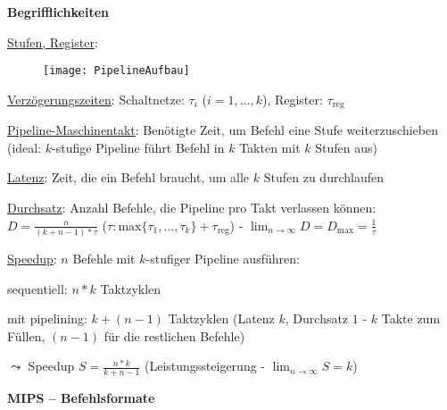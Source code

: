 \textbf{Begrifflichkeiten}
\begin{items}
  \item \underline{Stufen, Register}:
  \begin{figure}[H]
    \centering
    \label{PipelineAufbau}
    \texttt{[image: PipelineAufbau]}
  \end{figure}

  \item \underline{Verzögerungszeiten}: Schaltnetze: $\tau_i$ ($i=1,\dots,k$), Register: $\tau_{\text{reg}}$

  \item \underline{Pipeline-Maschinentakt}: Benötigte Zeit, um Befehl eine Stufe weiterzuschieben (ideal: $k$-stufige Pipeline führt Befehl in $k$ Takten mit $k$ Stufen aus)
  \item \underline{Latenz}: Zeit, die ein Befehl braucht, um alle $k$ Stufen zu durchlaufen
  \item \underline{Durchsatz}: Anzahl Befehle, die Pipeline pro Takt verlassen können: $D=\tfrac{n}{(k+n-1)*\tau}$ ($\tau: \text{max}\{ \tau_1,\dots,\tau_k \} + \tau_\text{reg}$) - $\lim_{n \to \infty} D = D_\text{max} = \tfrac{1}{\tau}$
  \item \underline{Speedup}: $n$ Befehle mit $k$-stufiger Pipeline ausführen:
  \begin{enumeration}
    \item sequentiell: $n*k$ Taktzyklen
    \item mit pipelining: $k+(n-1)$ Taktzyklen (Latenz $k$, Durchsatz $1$ - $k$ Takte zum Füllen, $(n-1)$ für die restlichen Befehle)
  \end{enumeration}
  $\leadsto$ Speedup $S=\tfrac{n*k}{k+n-1}$ (Leistungssteigerung - $\lim_{n \to \infty}S=k$)
\end{items}

\newpage

\textbf{MIPS  -- Befehlsformate}